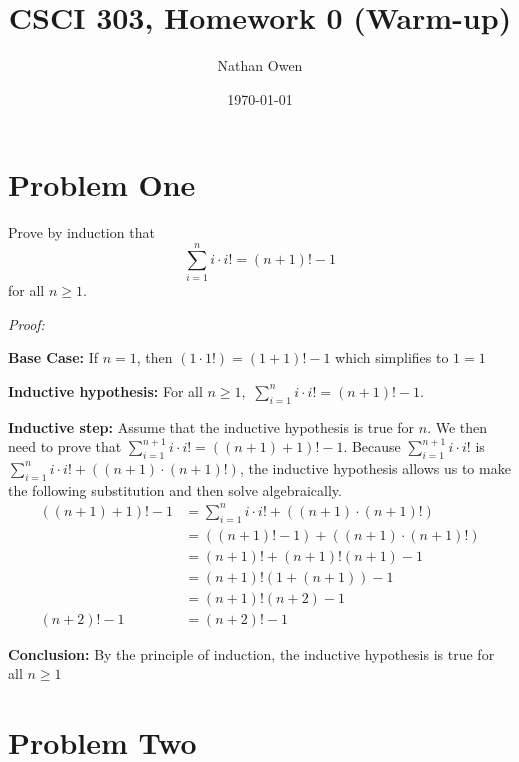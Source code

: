 \documentclass[10pt]{article}
\title{CSCI 303, Homework 0 (Warm-up)}
\author{Nathan Owen}
\date{\today}
\begin{document}
\maketitle
\section{Problem One}

\begin{flushleft}
Prove by induction that $$\sum\limits_{i=1}^n i\cdot i! = (n+1)! - 1$$ for all $n \geq 1$. 
\end{flushleft}
\textit{Proof:}


\begin{flushleft}
\textbf{Base Case:} If $n=1$, then $(1\cdot 1!) = (1+1)!-1$ which simplifies to $1 = 1$
\end{flushleft}



\begin{flushleft}
\textbf{Inductive hypothesis:} For all $n\geq 1,$ $\sum\limits_{i=1}^n i\cdot i! = (n+1)! - 1$.
\end{flushleft}

\begin{flushleft}
\textbf{Inductive step:} Assume that the inductive hypothesis is true for $n$. We then need to prove that $\sum\limits_{i=1}^{n+1} i\cdot i! = ((n+1)+1)! - 1$. Because $\sum\limits_{i=1}^{n+1} i\cdot i!$ is $\sum\limits_{i=1}^n i\cdot i! + ((n+1)\cdot (n+1)!)$, the inductive hypothesis allows us to make the following substitution and then solve algebraically. 
\begin{align}
((n+1)+1)! - 1 &= \sum\limits_{i=1}^n i\cdot i! + ((n+1)\cdot (n+1)!)\\
&= ((n+1)! -1) + ((n+1)\cdot (n+1)!)\\
&=(n+1)! + (n+1)!(n+1) -1\\
&=(n+1)!(1+(n+1))-1\\
&=(n+1)!(n+2)-1\\
(n+2)!-1 &= (n+2)!-1
\end{align}

\end{flushleft}

\begin{flushleft}
\textbf{Conclusion:} By the principle of induction, the inductive hypothesis is true for all $n \geq 1$
\end{flushleft}




\section{Problem Two}
\end{document}
